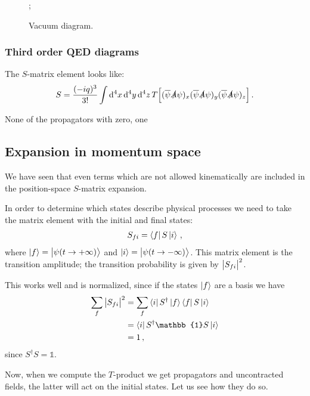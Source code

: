 \documentclass[main.tex]{subfiles}
\begin{document}
\begin{figure}[ht]
\centering
{};
\caption{Vacuum diagram.}
\label{fig:vacuum-QED}
\end{figure}

\subsubsection{Third order QED diagrams}

The \(S\)-matrix element looks like: 
%
\begin{align}
S = \frac{(-iq)^3}{3!} 
\int \dd[4]{x} \dd[4]{y} \dd[4]{z}
T \qty[ 
    (\overline{\psi} \slashed{A} \psi )_{x}
    (\overline{\psi} \slashed{A} \psi )_{y}
    (\overline{\psi} \slashed{A} \psi )_{z}
]
\,.
\end{align}

None of the propagators with zero, one 

\subsection{Expansion in momentum space}

We have seen that even terms which are not allowed kinematically are included in the position-space \(S\)-matrix expansion. 

In order to determine which states describe physical processes we need to take the matrix element with the initial and final states: 
%
\begin{align}
S_{fi} = \bra{f} S \ket{i}
\,,
\end{align}
%
where \(\ket{f} = \ket{\psi (t \to + \infty )}\) and \(\ket{i} = \ket{\psi (t \to - \infty )}\).
This matrix element is the transition amplitude; the transition probability is given by \(\abs{S_{fi}}^2\). 

This works well and is normalized, since if the states \(\ket{f}\) are a basis we have 
%
\begin{align}
\sum _{f} \abs{S_{fi}}^2
&= \sum_f \bra{i} S ^\dag \ket{f}\bra{f} S \ket{i}  \\
&= \bra{i} S ^\dag \mathbb{1} S \ket{i}  \\
&= 1
\,,
\end{align}
%
since \(S ^\dag S  = \mathbb{1}\). 

Now, when we compute the \(T\)-product we get propagators and uncontracted fields, the latter will act on the initial states.
Let us see how they do so. 
\end{document}
